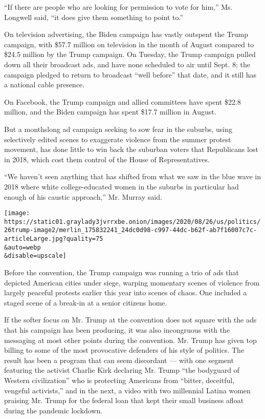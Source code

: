 ``If there are people who are looking for permission to vote for him,''
Ms. Longwell said, ``it does give them something to point to.''

On television advertising, the Biden campaign has vastly outspent the
Trump campaign, with \$57.7 million on television in the month of August
compared to \$24.5 million by the Trump campaign. On Tuesday, the Trump
campaign pulled down all their broadcast ads, and have none scheduled to
air until Sept. 8; the campaign pledged to return to broadcast ``well
before'' that date, and it still has a national cable presence.

On Facebook, the Trump campaign and allied committees have spent \$22.8
million, and the Biden campaign has spent \$17.7 million in August.

But a monthslong ad campaign seeking to sow fear in the suburbs, using
selectively edited scenes to exaggerate violence from the summer protest
movement, has done little to win back the suburban voters that
Republicans lost in 2018, which cost them control of the House of
Representatives.

``We haven't seen anything that has shifted from what we saw in the blue
wave in 2018 where white college-educated women in the suburbs in
particular had enough of his caustic approach,'' Mr. Murray said.

\texttt{[image: https://static01.graylady3jvrrxbe.onion/images/2020/08/26/us/politics/26trump-image2/merlin\_175832241\_24dc0d98-c997-44dc-b62f-ab7f16007c7c-articleLarge.jpg?quality=75\\\&auto=webp\\\&disable=upscale]}

Before the convention, the Trump campaign was running a trio of ads that
depicted American cities under siege, warping momentary scenes of
violence from largely peaceful protests earlier this year into scenes of
chaos. One included a staged scene of a break-in at a senior citizens
home.

If the softer focus on Mr. Trump at the convention does not square with
the ads that his campaign has been producing, it was also incongruous
with the messaging at most other points during the convention. Mr. Trump
has given top billing to some of the most provocative defenders of his
style of politics. The result has been a program that can seem
discordant --- with one segment featuring the activist Charlie Kirk
declaring Mr. Trump ``the bodyguard of Western civilization'' who is
protecting Americans from ``bitter, deceitful, vengeful activists,'' and
in the next, a video with two millennial Latina women praising Mr. Trump
for the federal loan that kept their small business afloat during the
pandemic lockdown.

